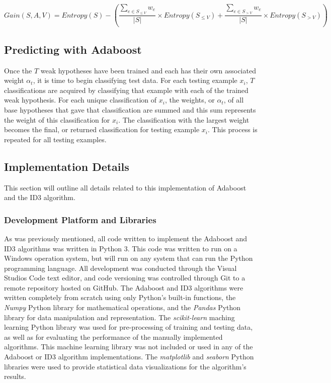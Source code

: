 \documentclass[a4paper]{article}
\begin{document}
\begin{equation}
    \label{eq:weighted-info-gain}
    Gain(S, A, V) = Entropy(S) - \left(\frac{\sum_{e \in S_{\le V}}w_e}{|S|}\times Entropy(S_{\le V}) + \frac{\sum_{e \in S_{> V}}w_e}{|S|}\times Entropy(S_{> V}) \right)
\end{equation}

\subsection{Predicting with Adaboost}
Once the $T$ weak hypotheses have been trained and each has their own associated weight $\alpha_t$, it is time to begin classifying test data. For each testing example $x_i$, $T$ classifications are acquired by classifying that example with each of the trained weak hypothesis. For each unique classification of $x_i$, the weights, or $\alpha_t$, of all base hypotheses that gave that classification are summed and this sum represents the weight of this classification for $x_i$. The classification with the largest weight becomes the final, or returned classification for testing example $x_i$. This process is repeated for all testing examples.

\subsection{Implementation Details}
This section will outline all details related to this implementation of Adaboost and the ID3 algorithm.

\subsubsection{Development Platform and Libraries}
As was previously mentioned, all code written to implement the Adaboost and ID3 algorithms was written in Python 3. This code was written to run on a Windows operation system, but will run on any system that can run the Python programming language. All development was conducted through the Visual Studios Code text editor, and code versioning was controlled through Git to a remote repository hosted on GitHub. The Adaboost and ID3 algorithms were written completely from scratch using only Python's built-in functions, the \textit{Numpy} Python library for mathematical operations, and the \textit{Pandas} Python library for data manipulation and representation. The \textit{scikit-learn} maching learning Python library was used for pre-processing of training and testing data, as well as for evaluating the performance of the manually implemented algorithms. This machine learning library was not included or used in any of the Adaboost or ID3 algorithm implementations. The \textit{matplotlib} and \textit{seaborn} Python libraries were used to provide statistical data visualizations for the algorithm's results.
\end{document}

